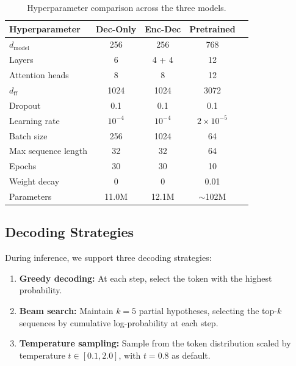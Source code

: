 \documentclass[11pt,a4paper]{article}
\begin{document}
\begin{table}[H]
\centering
\small
\renewcommand{\arraystretch}{1.1}
\caption{Hyperparameter comparison across the three models.}
\label{tab:hyperparams}
\begin{tabular}{lcccc}
\toprule
\textbf{Hyperparameter} & \textbf{Dec-Only} & \textbf{Enc-Dec} & \textbf{Pretrained} \\
\midrule
\(d_{\text{model}}\)    & 256   & 256   & 768 \\
Layers                  & 6     & 4 + 4 & 12 \\
Attention heads         & 8     & 8     & 12 \\
\(d_{\text{ff}}\)       & 1024  & 1024  & 3072 \\
Dropout                 & 0.1   & 0.1   & 0.1 \\
Learning rate           & \(10^{-4}\) & \(10^{-4}\) & \(2\times10^{-5}\) \\
Batch size              & 256   & 1024  & 64 \\
Max sequence length     & 32    & 32    & 64 \\
Epochs                  & 30    & 30    & 10 \\
Weight decay            & 0     & 0     & 0.01 \\
Parameters              & 11.0M & 12.1M & \(\sim\)102M \\
\bottomrule
\end{tabular}
\end{table}

\subsection{Decoding Strategies}

During inference, we support three decoding strategies:
\begin{enumerate}[nosep]
    \item \textbf{Greedy decoding:} At each step, select the token with the
          highest probability.
    \item \textbf{Beam search:} Maintain \(k=5\) partial hypotheses, selecting
          the top-\(k\) sequences by cumulative log-probability at each step.
    \item \textbf{Temperature sampling:} Sample from the token distribution
          scaled by temperature \(t \in [0.1, 2.0]\), with \(t=0.8\) as
          default.
\end{enumerate}

\end{document}

